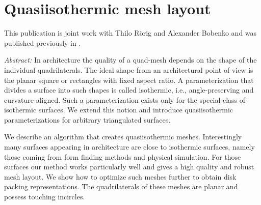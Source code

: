 \documentclass[Thesis.tex]{subfiles}
\begin{document}
\chapter{Quasiisothermic mesh layout}
\label{chp:quasiisothermic}

This publication is joint work with Thilo R{\"o}rig and Alexander Bobenko and was published 
previously in \cite{Sechelmann2012}.

\emph{Abstract:} 
In architecture the quality of a quad-mesh depends on the shape of the individual
quadrilaterals. The ideal shape from an architectural point of view is the
planar square or rectangles with fixed aspect ratio. A parameterization that divides a
surface into such shapes is called isothermic, i.e., angle-preserving and
curvature-aligned. Such a parameterization exists only for the special class of
isothermic surfaces. We extend this notion and introduce quasiisothermic
parameterizations for arbitrary triangulated  surfaces.

We describe an algorithm that creates quasiisothermic meshes.
Interestingly many surfaces appearing in architecture are close to
isothermic surfaces, namely those coming from form finding methods and physical
simulation. For those surfaces our method works particularly well and gives a
high quality and robust mesh layout. We show how to optimize such meshes
further to obtain disk packing representations. The quadrilaterals of these
meshes are planar and possess touching incircles.
\end{document}
